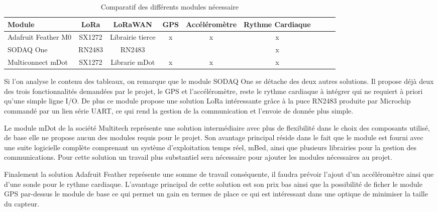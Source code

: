 \begin{table}[htb]
\caption[Comparatif Module]{Comparatif des différents modules nécessaire}
\label{tab:comparatif_modules}
\centering
\begin{tabular}{lcccccccc}
\toprule
Module & LoRa & LoRaWAN & GPS & Accéléromètre & Rythme Cardiaque \\ 
\midrule
Adafruit Feather M0	& SX1272	& Librairie tierce & x & x & x  \\
SODAQ One	& RN2483	& RN2483 & \checkmark & \checkmark & x \\
Multiconnect mDot & SX1272 & Librarie mDot & x & x & x \\
\bottomrule 
\end{tabular}
\end{table}

Si l’on analyse le contenu des tableaux, on remarque que le module SODAQ One se détache des deux autres solutions. Il propose déjà deux des trois fonctionnalités demandées par le projet, le GPS et l’accéléromètre, reste le rythme cardiaque à intégrer qui ne requiert à priori qu’une simple ligne I/O. De plus ce module propose une solution LoRa intéressante grâce à la puce RN2483 produite par Microchip commandé par un lien série UART, ce qui rend la gestion de la communication et l’envoie de donnée plus simple.

Le module mDot de la société Multitech représente une solution intermédiaire avec plus de flexibilité dans le choix des composants utilisé, de base elle ne propose aucun des modules requis pour le projet. Son avantage principal réside dans le fait que le module est fourni avec une suite logicielle complète comprenant un système d’exploitation temps réel, mBed, ainsi que plusieurs librairies pour la gestion des communications. Pour cette solution un travail plus substantiel sera nécessaire pour ajouter les modules nécessaires au projet.

Finalement la solution Adafruit Feather représente une somme de travail conséquente, il faudra prévoir l’ajout d’un accéléromètre ainsi que d’une sonde pour le rythme cardiaque. L’avantage principal de cette solution est son prix bas ainsi que la possibilité de ficher le module GPS par-dessus le module de base ce qui permet un gain en termes de place ce qui est intéressant dans une optique de minimiser la taille du capteur.

